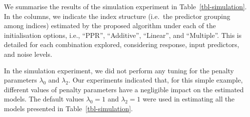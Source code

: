 \documentclass[
  11pt,
  a4paper,
]{article}
\begin{document}
We summarise the results of the simulation experiment in
Table~\ref{tbl-simulation}. In the columns, we indicate the index
structure (i.e.~the predictor grouping among indices) estimated by the
proposed algorithm under each of the initialisation options, i.e.,
``PPR'', ``Additive'', ``Linear'', and ``Multiple''. This is detailed
for each combination explored, considering response, input predictors,
and noise levels.

In the simulation experiment, we did not perform any tuning for the
penalty parameters \(\lambda_{0}\) and \(\lambda_{2}\). Our experiments
indicated that, for this simple example, different values of penalty
parameters have a negligible impact on the estimated models. The default
values \(\lambda_{0} = 1\) and \(\lambda_{2} = 1\) were used in
estimating all the models presented in Table~\ref{tbl-simulation}.
\end{document}
